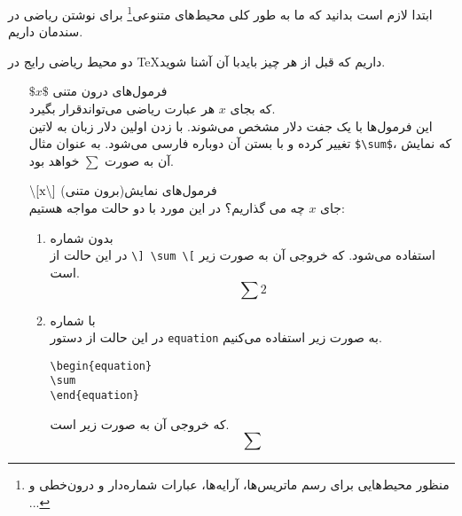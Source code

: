 ابتدا لازم است بدانید که ما به طور کلی محیط‌های متنوعی\footnote{منظور محیط‌هایی برای رسم ماتریس‌ها، آرایه‌ها، عبارات شماره‌دار و درون‌خطی و ...} برای نوشتن ریاضی در سندمان داریم.

\begin{definition}
دو محیط ریاضی رایج در \TeX داریم که قبل از هر چیز بایدبا آن آشنا شوید.
\begin{enumerate}
\item[$\$x\$ $]
فرمول‌های درون متنی\\
که بجای $x$ هر عبارت ریاضی می‌تواندقرار بگیرد.\\   
این فرمول‌ها  با یک جفت دلار مشخص می‌شوند. با زدن اولین دلار زبان به لاتین تغییر کرده و با بستن آن دوباره فارسی می‌شود. به عنوان مثال \verb|$\sum$|، که نمایش آن به صورت $\sum$ خواهد بود.

\item[$\backslash\rm{[} x \backslash\rm{]}$]
فرمول‌های نمایش(برون متنی)\\
جای $x$ چه می گذاریم؟
در این مورد با دو حالت مواجه هستیم:
\begin{enumerate}[ا.]
\item
بدون شماره\\
در این حالت از \verb|\] \sum \[| استفاده می‌شود. که خروجی آن به صورت زیر است.
\[\sum2\]
\item
با شماره\\
در این حالت از دستور \verb|equation| به صورت زیر استفاده می‌کنیم.

\begin{LTR}
\begin{verbatim}
\begin{equation}
\sum
\end{equation}
\end{verbatim}
\end{LTR}
که خروجی آن به صورت زیر است.
\begin{equation}
\sum
\end{equation}
\end{enumerate}
\end{enumerate}
\end{definition}


